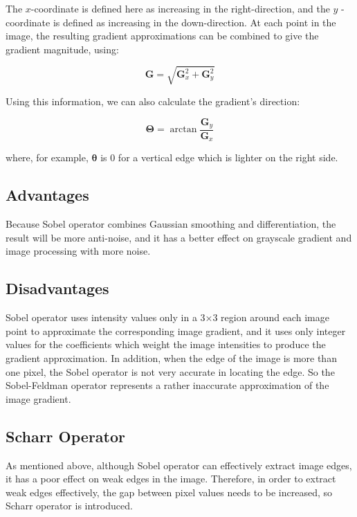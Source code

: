\documentclass[review]{cvpr}
\begin{document}
The $x$-coordinate is defined here as increasing in the right-direction, and the $y$ -coordinate is defined as increasing in the down-direction. At each point in the image, the resulting gradient approximations can be combined to give the gradient magnitude, using:

\begin{equation}
  \mathbf{G}=\sqrt{\mathbf{G}_{x}^{2}+\mathbf{G}_{y}^{2}}
\end{equation}

Using this information, we can also calculate the gradient's direction:

\begin{equation}
  \boldsymbol{\Theta}=\arctan \frac{\mathbf{G}_{y}}{\mathbf{G}_{x}}
\end{equation}


where, for example, $\boldsymbol{\theta}$ is 0 for a vertical edge which is lighter on the right side.

\subsection{Advantages}
Because Sobel operator combines Gaussian smoothing and differentiation, the result will be more anti-noise, and it has a better effect on grayscale gradient and image processing with more noise.

\subsection{Disadvantages}
Sobel operator uses intensity values only in a 3×3 region around each image point to approximate the corresponding image gradient, and it uses only integer values for the coefficients which weight the image intensities to produce the gradient approximation. In addition, when the edge of the image is more than one pixel, the Sobel operator is not very accurate in locating the edge. So the Sobel-Feldman operator represents a rather inaccurate approximation of the image gradient. 

\subsection{Scharr Operator}

As mentioned above, although Sobel operator can effectively extract image edges, it has a poor effect on weak edges in the image. Therefore, in order to extract weak edges effectively, the gap between pixel values needs to be increased, so Scharr operator is introduced.
\end{document}
